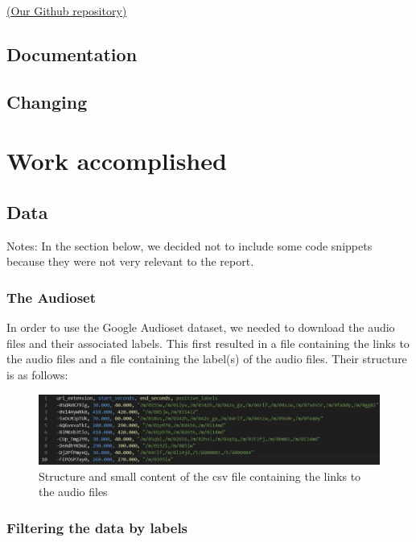 \documentclass[11pt]{article}
\begin{document}
\href{https://github.com/LGPolytech/Project_S9}{(Our Github repository)}



\subsection{Documentation}

\subsection{Changing}

\pagebreak

\section{Work accomplished}

\subsection{Data}

Notes: In the section below, we decided not to include some code snippets because they were not very relevant to the report.

\subsubsection{The Audioset}

In order to use the Google Audioset dataset, we needed to download the audio files and their associated labels. This first resulted in a file containing the links to the audio files and a file containing the label(s) of the audio files.
Their structure is as follows:

\begin{figure}[h]
  \centering
  \includegraphics[width=\textwidth]{./image/structure_csv1.png}
  \caption{Structure and small content of the csv file containing the links to the audio files}
  \label{fig:structure_csv1}
\end{figure}

\subsubsection*{Filtering the data by labels}
\end{document}
